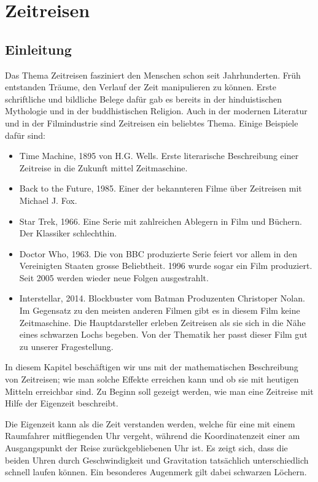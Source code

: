 \chapter{Zeitreisen\label{chapter:zeitreisen}}
\begin{refsection}
\section{Einleitung}
	Das Thema Zeitreisen fasziniert den Menschen schon seit Jahrhunderten. Früh entstanden Träume, den Verlauf der Zeit manipulieren zu können. Erste schriftliche und bildliche Belege dafür gab es bereits in der hinduistischen Mythologie und in der buddhistischen Religion. Auch in der modernen Literatur und in der Filmindustrie sind Zeitreisen ein beliebtes Thema. Einige Beispiele daf\"ur sind: 
\begin{itemize}
    \item Time Machine, 1895 von H.G. Wells. Erste literarische Beschreibung einer Zeitreise in die Zukunft mittel Zeitmaschine.
    \item Back to the Future, 1985. Einer der bekannteren Filme über Zeitreisen mit Michael J. Fox.
    \item Star Trek, 1966. Eine Serie mit zahlreichen Ablegern in Film und Büchern. Der Klassiker schlechthin. 
    \item Doctor Who, 1963. Die von BBC produzierte Serie feiert vor allem in den Vereinigten Staaten grosse Beliebtheit. 1996 wurde sogar ein Film produziert. Seit 2005 werden wieder neue Folgen ausgestrahlt.
    \item Interstellar, 2014. Blockbuster vom Batman Produzenten Christoper Nolan. Im Gegensatz zu den meisten anderen Filmen gibt es in diesem Film keine Zeitmaschine. Die Hauptdarsteller erleben Zeitreisen als sie sich in die Nähe eines schwarzen Lochs begeben. Von der Thematik her passt dieser Film gut zu unserer Fragestellung.
\end{itemize}

In diesem Kapitel beschäftigen wir uns mit der mathematischen Beschreibung von Zeitreisen; wie man solche Effekte erreichen kann und ob sie mit heutigen Mitteln erreichbar sind. Zu Beginn soll gezeigt werden, wie man eine Zeitreise mit Hilfe der Eigenzeit beschreibt.

Die Eigenzeit kann als die Zeit verstanden werden, welche für eine mit einem Raumfahrer mitfliegenden Uhr vergeht, während die Koordinatenzeit einer am Ausgangspunkt der Reise zurück\-gebliebenen Uhr ist.
Es zeigt sich, dass die beiden Uhren durch Geschwindigkeit und Gravitation tatsächlich unterschiedlich schnell laufen können. Ein besonderes Augenmerk gilt dabei schwarzen Löchern. 


\end{refsection}
